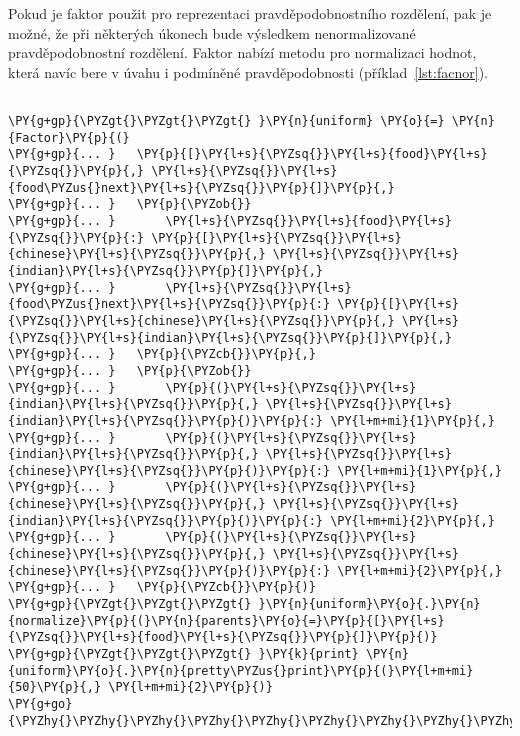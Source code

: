 Pokud je faktor použit pro reprezentaci pravděpodobnostního rozdělení, pak je možné, že při některých úkonech bude výsledkem nenormalizované pravděpodobnostní rozdělení.
Faktor nabízí metodu pro normalizaci hodnot, která navíc bere v úvahu i podmíněné pravděpodobnosti (příklad~\ref{lst:facnor}).

\begin{example}
\begin{Verbatim}[commandchars=\\\{\}]

\PY{g+gp}{\PYZgt{}\PYZgt{}\PYZgt{} }\PY{n}{uniform} \PY{o}{=} \PY{n}{Factor}\PY{p}{(}
\PY{g+gp}{... }   \PY{p}{[}\PY{l+s}{\PYZsq{}}\PY{l+s}{food}\PY{l+s}{\PYZsq{}}\PY{p}{,} \PY{l+s}{\PYZsq{}}\PY{l+s}{food\PYZus{}next}\PY{l+s}{\PYZsq{}}\PY{p}{]}\PY{p}{,}
\PY{g+gp}{... }   \PY{p}{\PYZob{}}
\PY{g+gp}{... }       \PY{l+s}{\PYZsq{}}\PY{l+s}{food}\PY{l+s}{\PYZsq{}}\PY{p}{:} \PY{p}{[}\PY{l+s}{\PYZsq{}}\PY{l+s}{chinese}\PY{l+s}{\PYZsq{}}\PY{p}{,} \PY{l+s}{\PYZsq{}}\PY{l+s}{indian}\PY{l+s}{\PYZsq{}}\PY{p}{]}\PY{p}{,}
\PY{g+gp}{... }       \PY{l+s}{\PYZsq{}}\PY{l+s}{food\PYZus{}next}\PY{l+s}{\PYZsq{}}\PY{p}{:} \PY{p}{[}\PY{l+s}{\PYZsq{}}\PY{l+s}{chinese}\PY{l+s}{\PYZsq{}}\PY{p}{,} \PY{l+s}{\PYZsq{}}\PY{l+s}{indian}\PY{l+s}{\PYZsq{}}\PY{p}{]}\PY{p}{,}
\PY{g+gp}{... }   \PY{p}{\PYZcb{}}\PY{p}{,}
\PY{g+gp}{... }   \PY{p}{\PYZob{}}
\PY{g+gp}{... }       \PY{p}{(}\PY{l+s}{\PYZsq{}}\PY{l+s}{indian}\PY{l+s}{\PYZsq{}}\PY{p}{,} \PY{l+s}{\PYZsq{}}\PY{l+s}{indian}\PY{l+s}{\PYZsq{}}\PY{p}{)}\PY{p}{:} \PY{l+m+mi}{1}\PY{p}{,}
\PY{g+gp}{... }       \PY{p}{(}\PY{l+s}{\PYZsq{}}\PY{l+s}{indian}\PY{l+s}{\PYZsq{}}\PY{p}{,} \PY{l+s}{\PYZsq{}}\PY{l+s}{chinese}\PY{l+s}{\PYZsq{}}\PY{p}{)}\PY{p}{:} \PY{l+m+mi}{1}\PY{p}{,}
\PY{g+gp}{... }       \PY{p}{(}\PY{l+s}{\PYZsq{}}\PY{l+s}{chinese}\PY{l+s}{\PYZsq{}}\PY{p}{,} \PY{l+s}{\PYZsq{}}\PY{l+s}{indian}\PY{l+s}{\PYZsq{}}\PY{p}{)}\PY{p}{:} \PY{l+m+mi}{2}\PY{p}{,}
\PY{g+gp}{... }       \PY{p}{(}\PY{l+s}{\PYZsq{}}\PY{l+s}{chinese}\PY{l+s}{\PYZsq{}}\PY{p}{,} \PY{l+s}{\PYZsq{}}\PY{l+s}{chinese}\PY{l+s}{\PYZsq{}}\PY{p}{)}\PY{p}{:} \PY{l+m+mi}{2}\PY{p}{,}
\PY{g+gp}{... }   \PY{p}{\PYZcb{}}\PY{p}{)}
\PY{g+gp}{\PYZgt{}\PYZgt{}\PYZgt{} }\PY{n}{uniform}\PY{o}{.}\PY{n}{normalize}\PY{p}{(}\PY{n}{parents}\PY{o}{=}\PY{p}{[}\PY{l+s}{\PYZsq{}}\PY{l+s}{food}\PY{l+s}{\PYZsq{}}\PY{p}{]}\PY{p}{)}
\PY{g+gp}{\PYZgt{}\PYZgt{}\PYZgt{} }\PY{k}{print} \PY{n}{uniform}\PY{o}{.}\PY{n}{pretty\PYZus{}print}\PY{p}{(}\PY{l+m+mi}{50}\PY{p}{,} \PY{l+m+mi}{2}\PY{p}{)}
\PY{g+go}{\PYZhy{}\PYZhy{}\PYZhy{}\PYZhy{}\PYZhy{}\PYZhy{}\PYZhy{}\PYZhy{}\PYZhy{}\PYZhy{}\PYZhy{}\PYZhy{}\PYZhy{}\PYZhy{}\PYZhy{}\PYZhy{}\PYZhy{}\PYZhy{}\PYZhy{}\PYZhy{}\PYZhy{}\PYZhy{}\PYZhy{}\PYZhy{}\PYZhy{}\PYZhy{}\PYZhy{}\PYZhy{}\PYZhy{}\PYZhy{}\PYZhy{}\PYZhy{}\PYZhy{}\PYZhy{}\PYZhy{}\PYZhy{}\PYZhy{}\PYZhy{}\PYZhy{}\PYZhy{}\PYZhy{}\PYZhy{}\PYZhy{}\PYZhy{}\PYZhy{}\PYZhy{}\PYZhy{}\PYZhy{}\PYZhy{}\PYZhy{}}

\end{Verbatim}
\end{example}
